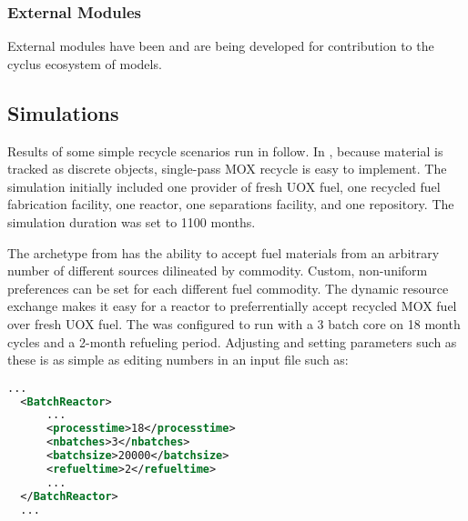 \subsubsection{External Modules}
External modules have been 
\cite{cyder,separations,streamblender,mktdriveninst,commodconverter} and are 
being \cite{britelite,utk} developed for contribution to the cyclus ecosystem 
of models. 



\subsection{Simulations}



Results of some simple recycle scenarios run in \Cyclus follow.  In \Cyclus,
because material is tracked as discrete objects, single-pass MOX recycle is
easy to implement.  The simulation initially included one provider of fresh
UOX fuel, one recycled fuel fabrication facility, one reactor, one separations
facility, and one repository. The simulation duration was set to 1100 months.

The  archetype from \Cycamore has the ability to accept
fuel materials from an arbitrary number of different sources dilineated by
commodity. Custom, non-uniform preferences can be set for each different fuel
commodity.  The dynamic resource exchange makes it easy for a reactor to
preferrentially accept recycled MOX fuel over fresh UOX fuel.  The
 was configured to run with a 3 batch core on 18 month cycles and
a 2-month refueling period.  Adjusting and setting parameters such as these is
as simple as editing numbers in an input file such as:

\begin{lstlisting}[language=xml]
  ...
  <BatchReactor>
      ...
      <processtime>18</processtime>
      <nbatches>3</nbatches>
      <batchsize>20000</batchsize>
      <refueltime>2</refueltime>
      ...
  </BatchReactor>
  ...
\end{lstlisting}


